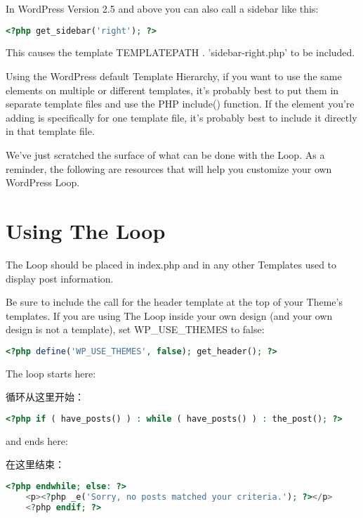 In WordPress Version 2.5 and above you can also call a sidebar like this:

\begin{lstlisting}[language=PHP]
	<?php get_sidebar('right'); ?>
\end{lstlisting}

This causes the template TEMPLATEPATH . 'sidebar-right.php' to be included.

Using the WordPress default Template Hierarchy, if you want to use the same elements on multiple or different templates, it's probably best to put them in separate template files and use the PHP include() function. If the element you're adding is specifically for one template file, it's probably best to include it directly in that template file.

We've just scratched the surface of what can be done with the Loop. As a reminder, the following are resources that will help you customize your own WordPress Loop.





\section{Using The Loop}


The Loop should be placed in index.php and in any other Templates used to display post information.

Be sure to include the call for the header template at the top of your Theme's templates. If you are using The Loop inside your own design (and your own design is not a template), set WP\_USE\_THEMES to false:

\begin{lstlisting}[language=PHP]
	<?php define('WP_USE_THEMES', false); get_header(); ?>
\end{lstlisting}

The loop starts here:

循环从这里开始：

\begin{lstlisting}[language=PHP]
	<?php if ( have_posts() ) : while ( have_posts() ) : the_post(); ?>
\end{lstlisting}

and ends here:

在这里结束：

\begin{lstlisting}[language=PHP]
	<?php endwhile; else: ?>
	<p><?php _e('Sorry, no posts matched your criteria.'); ?></p>
	<?php endif; ?>
\end{lstlisting}


